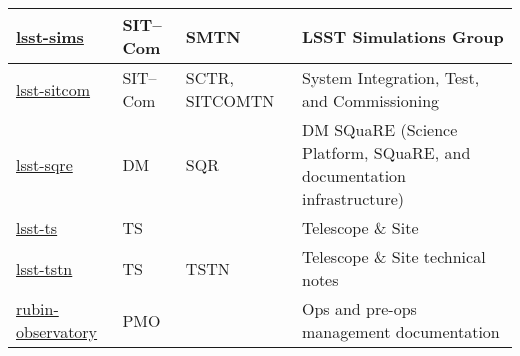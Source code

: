 \begin{small}
\begin{longtable}{p{}p{}p{}p{}}
\href{https://github.com/lsst-sims}{lsst-sims}				& SIT--Com	& SMTN	& LSST Simulations Group \\\hline
\href{https://github.com/lsst-sitcom}{lsst-sitcom}			& SIT--Com	& SCTR, SITCOMTN	& System Integration, Test, and Commissioning \\\hline
\href{https://github.com/lsst-sqre}{lsst-sqre}				& DM		& SQR	& DM SQuaRE (Science Platform, SQuaRE, and documentation infrastructure) \\\hline
\href{https://github.com/lsst-ts}{lsst-ts}				& TS			& &	Telescope \& Site \\\hline
\href{https://github.com/lsst-tstn}{lsst-tstn}				& TS			& TSTN	& Telescope \& Site  technical notes \\\hline
\href{https://github.com/rubin-observatory}{rubin-observatory}		& PMO		& &	Ops and pre-ops management documentation \\\hline

\end{longtable}

\end{small}